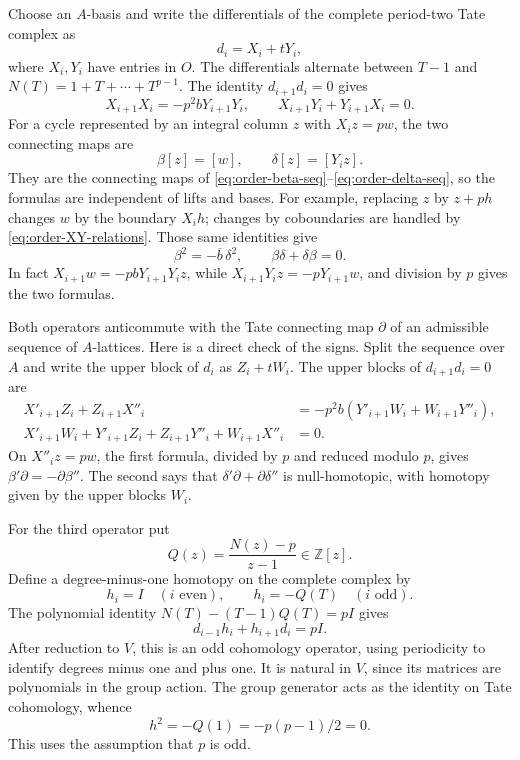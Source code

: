 Choose an $A$-basis and write the differentials of the complete
period-two Tate complex as
\[
 d_i=X_i+tY_i,
\]
where $X_i,Y_i$ have entries in $O$.  The differentials alternate
between $T-1$ and $N(T)=1+T+\cdots+T^{p-1}$.  The identity
$d_{i+1}d_i=0$ gives
\begin{equation}\label{eq:order-XY-relations}
 X_{i+1}X_i=-p^2bY_{i+1}Y_i,
 \qquad X_{i+1}Y_i+Y_{i+1}X_i=0.
\end{equation}
For a cycle represented by an integral column $z$ with $X_i z=pw$,
the two connecting maps are
\[
 \beta[z]=[w],\qquad \delta[z]=[Y_i z].
\]
They are the connecting maps of
\eqref{eq:order-beta-seq}--\eqref{eq:order-delta-seq}, so the formulas
are independent of lifts and bases.  For example, replacing $z$ by
$z+ph$ changes $w$ by the boundary $X_i h$; changes by coboundaries
are handled by \eqref{eq:order-XY-relations}.
Those same identities give
\begin{equation}\label{eq:order-beta-delta}
 \beta^2=-\overline b\,\delta^2,
 \qquad \beta\delta+\delta\beta=0.
\end{equation}
In fact $X_{i+1}w=-pbY_{i+1}Y_i z$, while
$X_{i+1}Y_i z=-pY_{i+1}w$, and division by $p$ gives the two formulas.

Both operators anticommute with the Tate connecting map $\partial$
of an admissible sequence of $A$-lattices.  Here is a direct check of
the signs.  Split the sequence over $A$ and write the upper block of
$d_i$ as $Z_i+tW_i$.  The upper blocks of $d_{i+1}d_i=0$ are
\begin{align*}
 X'_{i+1}Z_i+Z_{i+1}X''_i
   &=-p^2b(Y'_{i+1}W_i+W_{i+1}Y''_i),\\
 X'_{i+1}W_i+Y'_{i+1}Z_i+Z_{i+1}Y''_i+W_{i+1}X''_i&=0.
\end{align*}
On $X''_i z=pw$, the first formula, divided by $p$ and reduced
modulo $p$, gives $\beta'\partial=-\partial\beta''$.
The second says that
$\delta'\partial+\partial\delta''$ is null-homotopic, with homotopy
given by the upper blocks $W_i$.

For the third operator put
\[
 Q(z)=\frac{N(z)-p}{z-1}\in\mathbb Z[z].
\]
Define a degree-minus-one homotopy on the complete complex by
\[
 h_i=I\quad(i\text{ even}),\qquad
 h_i=-Q(T)\quad(i\text{ odd}).
\]
The polynomial identity $N(T)-(T-1)Q(T)=pI$ gives
\begin{equation}\label{eq:order-p-homotopy}
 d_{i-1}h_i+h_{i+1}d_i=pI.
\end{equation}
After reduction to $V$, this is an odd cohomology operator, using
periodicity to identify degrees minus one and plus one.  It is natural
in $V$, since its matrices are polynomials in the group action.
The group generator acts as the identity on Tate cohomology, whence
\begin{equation}\label{eq:order-h-square}
 h^2=-Q(1)=-p(p-1)/2=0.
\end{equation}
This uses the assumption that $p$ is odd.

